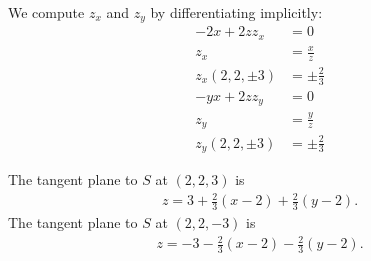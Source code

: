 \documentclass[answers]{exam}
\begin{document}
\begin{questions}
    \begin{solution}
        We compute $z_x$ and $z_y$ by differentiating implicitly:
        \begin{align*}
            -2x + 2zz_x &= 0\\
            z_x &= \frac xz\\
            z_x(2,2,\pm 3) &= \pm\frac2{3}\\
            -yx + 2zz_y &= 0\\
            z_y &= \frac yz\\
            z_y(2,2,\pm 3) &= \pm\frac2{3}
        \end{align*}
        
        The tangent plane to $S$ at $(2,2,3)$ is
        \begin{align*}
            z = 3 + \frac23(x-2) + \frac23(y-2).
        \end{align*}
        The tangent plane to $S$ at $(2,2,-3)$ is
        \begin{align*}
            z = -3 - \frac23(x-2) - \frac23(y-2).
        \end{align*}
    \end{solution}
\end{questions}
\end{document}
